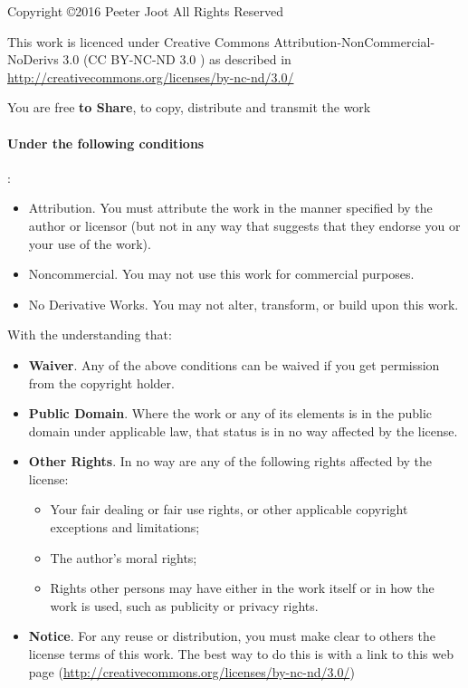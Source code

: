 Copyright \copyright 2016 Peeter Joot
All Rights Reserved

This work is licenced under Creative Commons Attribution-NonCommercial-NoDerivs 3.0 (CC BY-NC-ND 3.0 \ccbyncnd) as described in \href{http://creativecommons.org/licenses/by-nc-nd/3.0/}{http://creativecommons.org/licenses/by-nc-nd/3.0/}

You are free \textbf{to Share}, to copy, distribute and transmit the work

\paragraph{Under the following conditions}:

\begin{itemize}
\item \ccAttribution Attribution.  You must attribute the work in the manner specified by the author or licensor (but not in any way that suggests that they endorse you or your use of the work).
\item \ccNonCommercial Noncommercial. You may not use this work for commercial purposes.
\item \ccNoDerivatives No Derivative Works. You may not alter, transform, or build upon this work.
\end{itemize}

With the understanding that:

\begin{itemize}
\item \textbf{Waiver}. Any of the above conditions can be waived if you get permission from the copyright holder.
\item \textbf{Public Domain}. Where the work or any of its elements is in the public domain under applicable law, that status is in no way affected by the license.
\item \textbf{Other Rights}. In no way are any of the following rights affected by the license:

\begin{itemize}
\item Your fair dealing or fair use rights, or other applicable copyright exceptions and limitations;
\item The author's moral rights;
\item Rights other persons may have either in the work itself or in how the work is used, such as publicity or privacy rights.
\end{itemize}

\item \textbf{Notice}. For any reuse or distribution, you must make clear to others the license terms of this work. The best way to do this is with a link to this web page (\href{http://creativecommons.org/licenses/by-nc-nd/3.0/}{http://creativecommons.org/licenses/by-nc-nd/3.0/})
\end{itemize}
